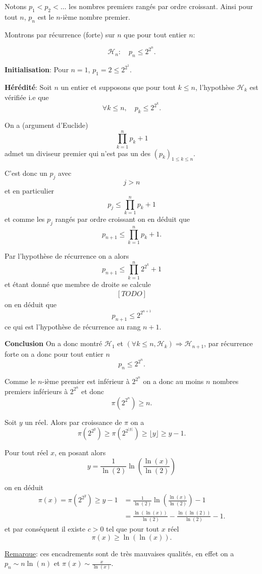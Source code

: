 \begin{sol}
    Notons $p_1 < p_2 < \ldots$ les nombres premiers rangés par ordre croissant. Ainsi pour tout $n$, $p_n$ est le $n$-ième nombre premier.
    
    Montrons par récurrence (forte) sur $n$ que pour tout entier $n$:

   \[\mathcal{H}_n: \quad p_n \leq 2^{2^n}.\]
   
   \textbf{Initialisation}: Pour $n=1$, $p_1 = 2 \leq 2^{2^1}$.


   \textbf{Hérédité}: Soit $n$ un entier et supposons que pour tout $k \leq n$, l'hypothèse $\mathcal{H}_k$ est vérifiée i.e que
   \[\forall k \leq n, \quad p_k \leq 2^{2^k}.\]

   On a (argument d'Euclide)
   \[\prod_{k=1}^n p_k +1\]
   admet un diviseur premier qui n'est pas un des $(p_k)_{1 \leq k \leq n}$.

   C'est donc un $p_j$ avec \[j > n\] et en particulier
   \[p_j \leq \prod_{k=1}^n p_k +1\]
   et comme les $p_j$ rangés par ordre croissant on en déduit que
   \[p_{n+1} \leq \prod_{k=1}^n p_k +1.\]


   Par l'hypothèse de récurrence on a alors
   \[p_{n+1} \leq \prod_{k=1}^n 2^{2^k} +1\]
    et étant donné que membre de droite se calcule
    \[\begin{aligned}
        [TODO]
    \end{aligned}\]
    on en déduit que
    \[p_{n+1} \leq 2^{2^{n+1}}\]
    ce qui est l'hypothèse de récurrence au rang $n+1$.


    \textbf{Conclusion} On a donc montré $\mathcal{H}_1$ et $\left(\forall k \leq n, \mathcal{H}_k \right) \Rightarrow \mathcal{H}_{n+1}$, par récurrence forte on a donc pour tout entier $n$
    \[\boxed{p_n \leq 2^{2^n}}.\]

    Comme le $n$-ième premier est inférieur à $2^{2^n}$ on a donc au moins $n$ nombres premiers inférieurs à $2^{2^n}$ et donc 
    \[\pi(2^{2^n}) \geq n.\]

    Soit $y$ un réel. Alors par croissance de $\pi$ on a
    \[\pi(2^{2^{y}}) \geq \pi(2^{2^{\lfloor y \rfloor}})  \geq \lfloor y \rfloor \geq y-1.\]

    Pour tout réel $x$, en posant alors
    \[ y = \frac{1}{\ln(2)}\ln \left( \frac{\ln(x)}{\ln(2)} \right) \]

    on en déduit
    \begin{equation*}
        \begin{aligned}
            \pi(x) =\pi \left( 2^{2^y} \right) \geq y -1 &= \frac{1}{\ln(2)}\ln \left( \frac{\ln(x)}{\ln(2)} \right) -1\\
            &=\frac{\ln(\ln(x))}{\ln(2)}- \frac{\ln(\ln(2))}{\ln(2)} -1.
        \end{aligned}
    \end{equation*}
    et par conséquent il existe $c > 0$ tel que pour tout $x$ réel
    \[\boxed{\pi(x) \geq \ln(\ln(x))}.\]

    \underline{Remarque}: ces encadrements sont de très mauvaises qualités, en effet on a $p_n \sim n \ln(n)$ et $\pi(x) \sim \frac{x}{\ln(x)}$.
\end{sol}

